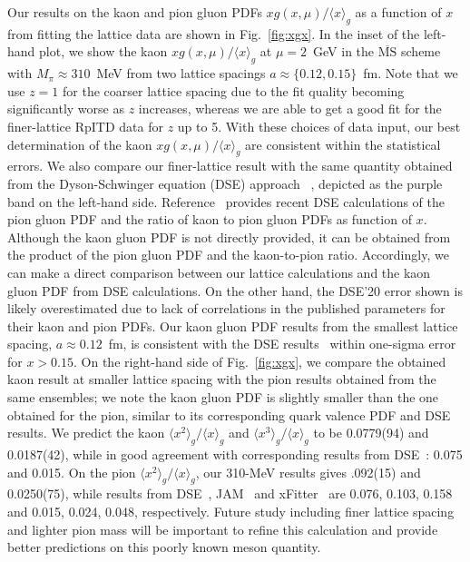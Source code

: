 Our results on the kaon and pion gluon PDFs $xg(x, \mu)/\langle x \rangle_g$ as a function of $x$ from fitting the lattice data are shown in Fig.~\ref{fig:xgx}.
In the inset of the left-hand plot, we show the kaon $xg(x, \mu)/\langle x \rangle_g$ at $\mu=2$~GeV in the $\overline{\text{MS}}$ scheme with $M_\pi\approx 310$~MeV from two lattice spacings $a\approx\{0.12,0.15\}$~fm.
Note that we use $z=1$ for the coarser lattice spacing due to the fit quality becoming significantly worse as $z$ increases, whereas we are able to get a good fit for the finer-lattice RpITD data for $z$ up to 5.
With these choices of data input, our best determination of the kaon $xg(x, \mu)/\langle x \rangle_g$ are consistent within the statistical errors.
We also compare our finer-lattice result with the same quantity obtained from the Dyson-Schwinger equation (DSE) approach ~\cite{Cui:2020tdf}, depicted as the purple band on the left-hand side.
%
Reference~\cite{Cui:2020tdf} provides recent DSE calculations of the pion gluon PDF and the ratio of kaon to pion gluon PDFs as function of $x$.
Although the kaon gluon PDF is not directly provided, it can be obtained from the product of the pion gluon PDF and the kaon-to-pion ratio.
Accordingly, we can make a direct comparison between our lattice calculations and the kaon gluon PDF from DSE calculations.
On the other hand, the DSE'20 error shown is likely overestimated due to lack of correlations in the published parameters for their kaon and pion PDFs.
%
Our kaon gluon PDF results from the smallest lattice spacing, $a\approx 0.12$~fm, is consistent with the DSE results~\cite{Cui:2020tdf} within one-sigma error for $x>0.15$.
On the right-hand side of Fig.~\ref{fig:xgx}, we compare the obtained kaon result at smaller lattice spacing with the pion results obtained from the same ensembles;
we note the kaon gluon PDF is slightly smaller than the one obtained for the pion, similar to its corresponding quark valence PDF and DSE~\cite{Cui:2020tdf} results.
%
We predict the kaon $\langle x^2 \rangle_g/\langle x \rangle_g$ and  $\langle x^3 \rangle_g/\langle x \rangle_g$ to be 0.0779(94) and 0.0187(42), while in good agreement with corresponding results from DSE~\cite{Cui:2020tdf}: 0.075 and 0.015.
On the pion $\langle x^2 \rangle_g/\langle x \rangle_g$, our 310-MeV results gives
 .092(15) and 0.0250(75),
while results from DSE~\cite{Cui:2020tdf},  JAM~\cite{Barry:2018ort,Cao:2021aci} and xFitter~\cite{Novikov:2020snp}
are
0.076, 0.103, 0.158
and 0.015, 0.024, 0.048,
respectively.
%
Future study including finer lattice spacing and lighter pion mass will be important to refine this calculation and provide better predictions on this poorly known meson quantity.
